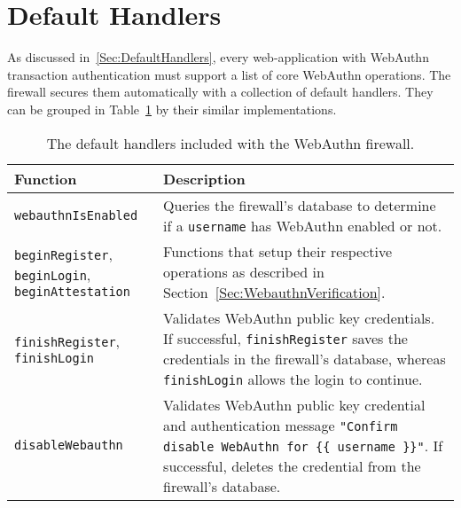\section{Default Handlers}

As discussed in~\ref{Sec:DefaultHandlers}, every web-application with WebAuthn transaction authentication must support a list of core WebAuthn operations. The firewall secures them automatically with a collection of default handlers. They can be grouped in Table~\ref{Table:Implementation_DefaultHandlers} by their similar implementations.


\begin{table}[h]
\centering

\begin{tabular}{ m{3cm} m{11cm}  } 
 \hline
 Function & Description \\ 
 \hline \hline

 \lstinline|webauthnIsEnabled| & Queries the firewall's database to determine if a \lstinline|username| has WebAuthn enabled or not. \\ \hline

 \lstinline|beginRegister|, \lstinline|beginLogin|, \lstinline|beginAttestation| & Functions that setup their respective operations as described in Section~\ref{Sec:WebauthnVerification}. \\ \hline

 \lstinline|finishRegister|, \lstinline|finishLogin| & Validates WebAuthn public key credentials. If successful, \lstinline|finishRegister| saves the credentials in the firewall's database, whereas \lstinline|finishLogin| allows the login to continue. \\ \hline

 \lstinline|disableWebauthn| & Validates WebAuthn public key credential and authentication message \lstinline|"Confirm disable WebAuthn for {{ username }}"|. If successful, deletes the credential from the firewall's database. \\ \hline

\end{tabular}
\caption{The default handlers included with the WebAuthn firewall.}
\label{Table:Implementation_DefaultHandlers}
\end{table}

